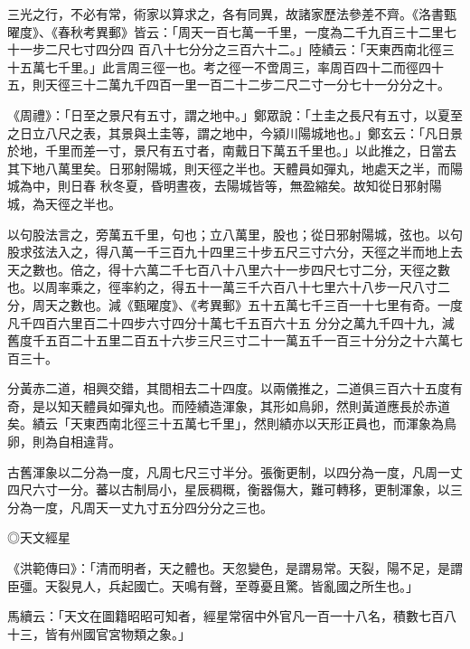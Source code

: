 \begin{pinyinscope}
{{ 三光之行，不必有常，術家以算求之，各有同異，故諸家歷法參差不齊。《洛書甄曜度》、《春秋考異郵》皆云：「周天一百七萬一千里，一度為二千九百三十二里七十一步二尺七寸四分四
 百八十七分分之三百六十二。」陸績云：「天東西南北徑三十五萬七千里。」此言周三徑一也。考之徑一不啻周三，率周百四十二而徑四十五，則天徑三十二萬九千四百一里一百二十二步二尺二寸一分七十一分分之十。



 《周禮》：「日至之景尺有五寸，謂之地中。」鄭眾說：「土圭之長尺有五寸，以夏至之日立八尺之表，其景與土圭等，謂之地中，今潁川陽城地也。」鄭玄云：「凡日景於地，千里而差一寸，景尺有五寸者，南戴日下萬五千里也。」以此推之，日當去其下地八萬里矣。日邪射陽城，則天徑之半也。天體員如彈丸，地處天之半，而陽城為中，則日春
 秋冬夏，昏明晝夜，去陽城皆等，無盈縮矣。故知從日邪射陽城，為天徑之半也。



 以句股法言之，旁萬五千里，句也；立八萬里，股也；從日邪射陽城，弦也。以句股求弦法入之，得八萬一千三百九十四里三十步五尺三寸六分，天徑之半而地上去天之數也。倍之，得十六萬二千七百八十八里六十一步四尺七寸二分，天徑之數也。以周率乘之，徑率約之，得五十一萬三千六百八十七里六十八步一尺八寸二分，周天之數也。減《甄曜度》、《考異郵》五十五萬七千三百一十七里有奇。一度凡千四百六里百二十四步六寸四分十萬七千五百六十五
 分分之萬九千四十九，減舊度千五百二十五里二百五十六步三尺三寸二十一萬五千一百三十分分之十六萬七百三十。



 分黃赤二道，相興交錯，其間相去二十四度。以兩儀推之，二道俱三百六十五度有奇，是以知天體員如彈丸也。而陸績造渾象，其形如鳥卵，然則黃道應長於赤道矣。績云「天東西南北徑三十五萬七千里」，然則績亦以天形正員也，而渾象為鳥卵，則為自相違背。



 古舊渾象以二分為一度，凡周七尺三寸半分。張衡更制，以四分為一度，凡周一丈四尺六寸一分。蕃以古制局小，星辰稠穊，衡器傷大，難可轉移，更制渾象，以三
 分為一度，凡周天一丈九寸五分四分分之三也。



 ◎天文經星



 《洪範傳曰》：「清而明者，天之體也。天忽變色，是謂易常。天裂，陽不足，是謂臣彊。天裂見人，兵起國亡。天鳴有聲，至尊憂且驚。皆亂國之所生也。」



 馬續云：「天文在圖籍昭昭可知者，經星常宿中外官凡一百一十八名，積數七百八十三，皆有州國官宮物類之象。」



}}
\end{pinyinscope}
